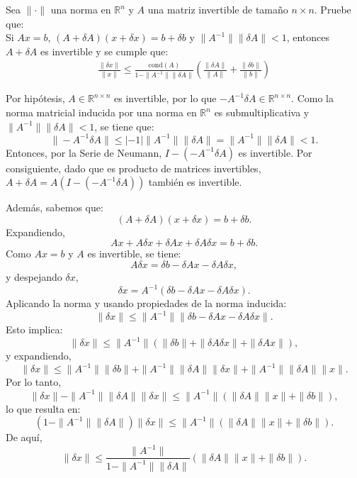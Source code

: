 \begin{homeworkProblem}
   Sea $\| \cdot\|$ una norma en $\mathbb{R}^n$ y $A$ una matriz invertible de tamaño $n\times n$. Pruebe que: \\
    Si $Ax=b$, $(A+\delta A)(x+\delta x)=b+\delta b$ y $\| A^{-1}\|\| \delta A\|< 1$, entonces $A+\delta A$ es invertible y se cumple que: 
    \begin{align*}       
      \frac{\| \delta x\|}{\|x\|} \leq \frac{\text{cond}(A)}{1-\| A^{-1}\|\| \delta A\|}\left( \frac{\| \delta A\|}{\|A\|}+\frac{\| \delta b\|}{\|b\|}\right)
    \end{align*}
  \begin{solucion}
    Por hipótesis, $A \in \mathbb{R}^{n \times n}$ es invertible, por lo que $-A^{-1} \delta A \in \mathbb{R}^{n \times n}$. Como la norma matricial inducida por una norma en $\mathbb{R}^n$ es submultiplicativa y $\| A^{-1} \|\| \delta A \| < 1$, se tiene que:
    \[
      \| - A^{-1} \delta A \| \leq |-1| \| A^{-1} \| \| \delta A \| = \| A^{-1} \| \| \delta A \| < 1.
    \]
    Entonces, por la Serie de Neumann, $I - (-A^{-1} \delta A)$ es invertible. Por consiguiente, dado que es producto de matrices invertibles, $A + \delta A = A(I - (-A^{-1} \delta A))$ también es invertible.

    Además, sabemos que:
    \[
      (A + \delta A)(x + \delta x) = b + \delta b.
    \]
    Expandiendo,
    \[
      Ax + A \delta x + \delta A x + \delta A \delta x = b + \delta b.
    \]
    Como $Ax = b$ y $A$ es invertible, se tiene:
    \[
      A \delta x = \delta b - \delta A x - \delta A \delta x,
    \]
    y despejando $\delta x$,
    \[
      \delta x = A^{-1} (\delta b - \delta A x - \delta A \delta x).
    \]
    Aplicando la norma y usando propiedades de la norma inducida:
    \[
      \| \delta x \| \leq \| A^{-1} \| \| \delta b - \delta A x - \delta A \delta x \|.
    \]
    Esto implica:
    \[
      \| \delta x \| \leq \| A^{-1} \| (\| \delta b \| + \| \delta A \delta x \| + \| \delta A x \|),
    \]
    y expandiendo,
    \[
      \| \delta x \| \leq \| A^{-1} \| \| \delta b \| + \| A^{-1} \| \| \delta A \| \| \delta x \| + \| A^{-1} \| \| \delta A \| \| x \|.
    \]
    Por lo tanto,
    \[
      \| \delta x \| - \| A^{-1} \| \| \delta A \| \| \delta x \| \leq \| A^{-1} \| (\| \delta A \| \| x \| + \| \delta b \|),
    \]
    lo que resulta en:
    \[
      (1 - \| A^{-1} \| \| \delta A \|) \| \delta x \| \leq \| A^{-1} \| (\| \delta A \| \| x \| + \| \delta b \|).
    \]
    De aquí,
    \begin{equation}
      \| \delta x \| \leq \frac{\| A^{-1} \|}{1 - \| A^{-1} \| \| \delta A \|} (\| \delta A \| \| x \| + \| \delta b \|).
    \end{equation}
    

\end{solucion}
\end{homeworkProblem}
